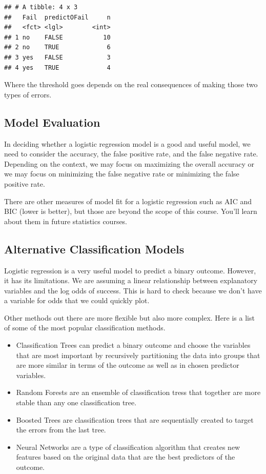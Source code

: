 \documentclass[]{book}
\begin{document}
\begin{verbatim}
## # A tibble: 4 x 3
##   Fail  predictOFail     n
##   <fct> <lgl>        <int>
## 1 no    FALSE           10
## 2 no    TRUE             6
## 3 yes   FALSE            3
## 4 yes   TRUE             4
\end{verbatim}

Where the threshold goes depends on the real consequences of making those two types of errors.

\hypertarget{model-evaluation-1}{%
\subsection{Model Evaluation}\label{model-evaluation-1}}

In deciding whether a logistic regression model is a good and useful model, we need to consider the accuracy, the false positive rate, and the false negative rate. Depending on the context, we may focus on maximizing the overall accuracy or we may focus on minimizing the false negative rate or minimizing the false positive rate.

There are other measures of model fit for a logistic regression such as AIC and BIC (lower is better), but those are beyond the scope of this course. You'll learn about them in future statistics courses.

\hypertarget{alternative-classification-models}{%
\subsection{Alternative Classification Models}\label{alternative-classification-models}}

Logistic regression is a very useful model to predict a binary outcome. However, it has its limitations. We are assuming a linear relationship between explanatory variables and the log odds of success. This is hard to check because we don't have a variable for odds that we could quickly plot.

Other methods out there are more flexible but also more complex. Here is a list of some of the most popular classification methods.

\begin{itemize}
\item
  Classification Trees can predict a binary outcome and choose the variables that are most important by recursively partitioning the data into groups that are more similar in terms of the outcome as well as in chosen predictor variables.
\item
  Random Forests are an ensemble of classification tress that together are more stable than any one classification tree.
\item
  Boosted Trees are classification trees that are sequentially created to target the errors from the last tree.
\item
  Neural Networks are a type of classification algorithm that creates new features based on the original data that are the best predictors of the outcome.
\end{itemize}
\end{document}
